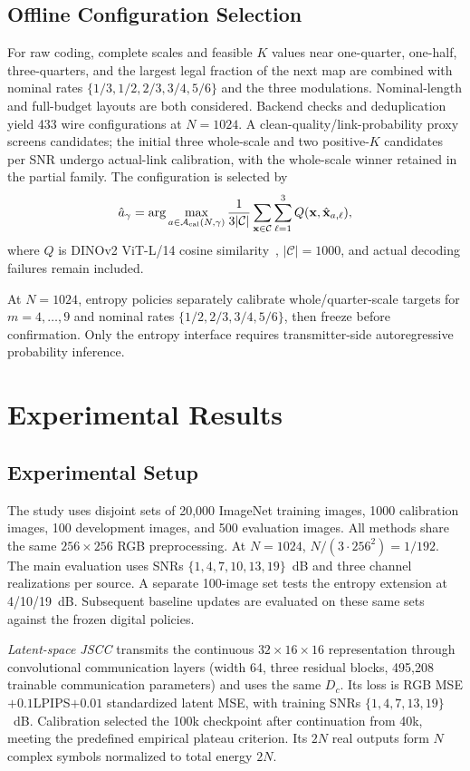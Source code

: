 \documentclass[journal]{IEEEtran}
\begin{document}
\subsection{Offline Configuration Selection}
For raw coding, complete scales and feasible $K$ values near one-quarter, one-half, three-quarters, and the largest legal fraction of the next map are combined with nominal rates $\{1/3,1/2,2/3,3/4,5/6\}$ and the three modulations. Nominal-length and full-budget layouts are both considered. Backend checks and deduplication yield 433 wire configurations at $N=1024$. A clean-quality/link-probability proxy screens candidates; the initial three whole-scale and two positive-$K$ candidates per SNR undergo actual-link calibration, with the whole-scale winner retained in the partial family. The configuration is selected by
\begin{equation}
\hat a_\gamma=\arg\max_{a\in\mathcal A_{\rm cal}(N,\gamma)}
\frac{1}{3|\mathcal C|}\sum_{\mathbf x\in\mathcal C}\sum_{\ell=1}^{3}
Q(\mathbf x,\hat{\mathbf x}_{a,\ell}),
\label{eq:selection}
\end{equation}
where $Q$ is DINOv2 ViT-L/14 cosine similarity~\cite{oquab2024dinov2}, $|\mathcal C|=1000$, and actual decoding failures remain included.

At $N=1024$, entropy policies separately calibrate whole/quarter-scale targets for $m=4,\ldots,9$ and nominal rates $\{1/2,2/3,3/4,5/6\}$, then freeze before confirmation. Only the entropy interface requires transmitter-side autoregressive probability inference.

\section{Experimental Results}
\subsection{Experimental Setup}
The study uses disjoint sets of 20,000 ImageNet training images, 1000 calibration images, 100 development images, and 500 evaluation images. All methods share the same $256\times256$ RGB preprocessing. At $N=1024$, $N/(3\cdot256^2)=1/192$. The main evaluation uses SNRs $\{1,4,7,10,13,19\}$~dB and three channel realizations per source. A separate 100-image set tests the entropy extension at 4/10/19~dB. Subsequent baseline updates are evaluated on these same sets against the frozen digital policies.

\emph{Latent-space JSCC} transmits the continuous $32\times16\times16$ representation through convolutional communication layers (width 64, three residual blocks, 495,208 trainable communication parameters) and uses the same $D_c$. Its loss is RGB MSE$+0.1$LPIPS$+0.01$ standardized latent MSE, with training SNRs $\{1,4,7,13,19\}$~dB. Calibration selected the 100k checkpoint after continuation from 40k, meeting the predefined empirical plateau criterion. Its $2N$ real outputs form $N$ complex symbols normalized to total energy $2N$.
\end{document}
